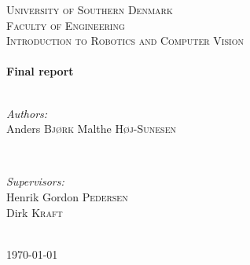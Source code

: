 \begin{titlepage}

    \center
    \textsc{\LARGE University of Southern Denmark\\Faculty of Engineering}\\[1.5cm] %
    \textsc{\Large Introduction to Robotics and Computer Vision
    }\\[0.5cm] %
    \HRule \\[0.4cm]

    { \huge \bfseries Final report}\\[0.4cm]
    \HRule \\[1.5cm]
    \begin{minipage}{0.4\textwidth}
        \begin{flushleft} \large
            \emph{Authors:}\\
            Anders \textsc{Bjørk}
            \newline
            Malthe \textsc{Høj-Sunesen} %
        \end{flushleft}
    \end{minipage}
    ~
    \begin{minipage}{0.4\textwidth}
        \begin{flushright} \large
            \emph{Supervisors:} \\
            Henrik Gordon \textsc{Pedersen}\\
            Dirk \textsc{Kraft} %
        \end{flushright}
    \end{minipage}\\[4cm]


    {\large \today}\\[3cm] %
    \vfill %

\end{titlepage}
